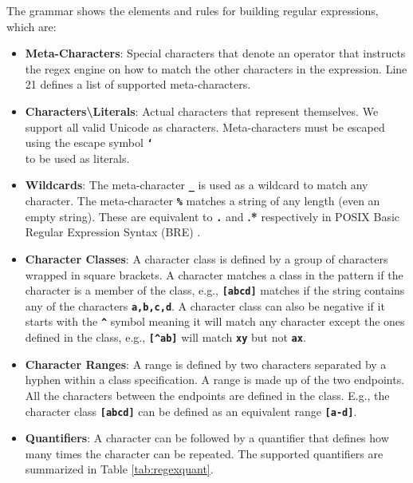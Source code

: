 The grammar shows the elements and rules for building regular expressions, which are:
\begin{itemize}
    \item \textbf{Meta-Characters}: Special characters that denote an operator that instructs the regex engine on how to match the other characters in the expression. Line 21 defines a list of supported meta-characters.
    
    \item \textbf{Characters\textbackslash Literals}: Actual characters that represent themselves. We support all valid Unicode as characters. Meta-characters must be escaped using the escape symbol \texttt{\textbf{\char`\\}} to be used as literals.
    
    \item \textbf{Wildcards}: The meta-character \texttt{\textbf{\_}} is used as a wildcard to match any character. The meta-character \texttt{\textbf{\%}} matches a string of any length (even an empty string). These are equivalent to \texttt{\textbf{.}} and \textbf{.*} respectively in POSIX Basic Regular Expression Syntax (BRE) \cite{bre}.
    
    \item \textbf{Character Classes}: A character class is defined by a group of characters wrapped in square brackets. A character matches a class in the pattern if the character is a member of the class, e.g., \texttt{\textbf{[abcd]}} matches if the string contains any of the characters \texttt{\textbf{a,b,c,d}}. A character class can also be negative if it starts with the \texttt{\textbf{\^{}}} symbol meaning it will match any character except the ones defined in the class, e.g., \texttt{\textbf{[\^{}ab]}} will match \texttt{\textbf{xy}} but not \texttt{\textbf{ax}}.
    
    \item \textbf{Character Ranges}: A range is defined by two characters separated by a hyphen within a class specification. A range is made up of the two endpoints. All the characters between the endpoints are defined in the class. E.g., the character class \texttt{\textbf{[abcd]}} can be defined as an equivalent range \texttt{\textbf{[a-d]}}.
    
    \item \textbf{Quantifiers}: A character can be followed by a quantifier that defines how many times the character can be repeated. The supported quantifiers are summarized in Table \ref{tab:regexquant}.
    


\end{itemize}

